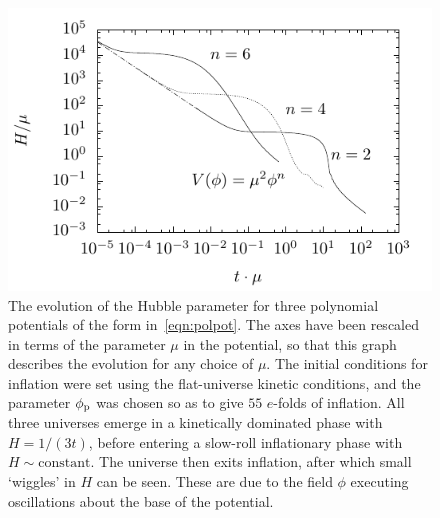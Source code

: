 \begin{figure}[tp]
  \includegraphics[width=\textwidth]{chapters/kinetic_dominance/figures/Hpol}
  \caption{The evolution of the Hubble parameter for three polynomial potentials of the form in~\eqref{eqn:polpot}. The axes have been rescaled in terms of the parameter \(\mu\) in the potential, so that this graph describes the evolution for any choice of \(\mu\). The initial conditions for inflation were set using the flat-universe kinetic conditions, and the parameter \(\phi_{\mathrm{p}}\) was chosen so as to give \(55\) \(e\)-folds of inflation. All three universes emerge in a kinetically dominated phase with \(H=1/(3t)\), before entering a slow-roll inflationary phase with \(H\sim\mathrm{constant}\). The universe then exits inflation, after which small `wiggles' in \(H\) can be seen. These are due to the field \(\phi\) executing oscillations about the base of the potential.}\label{fig:figure_Hpol}
\end{figure}

